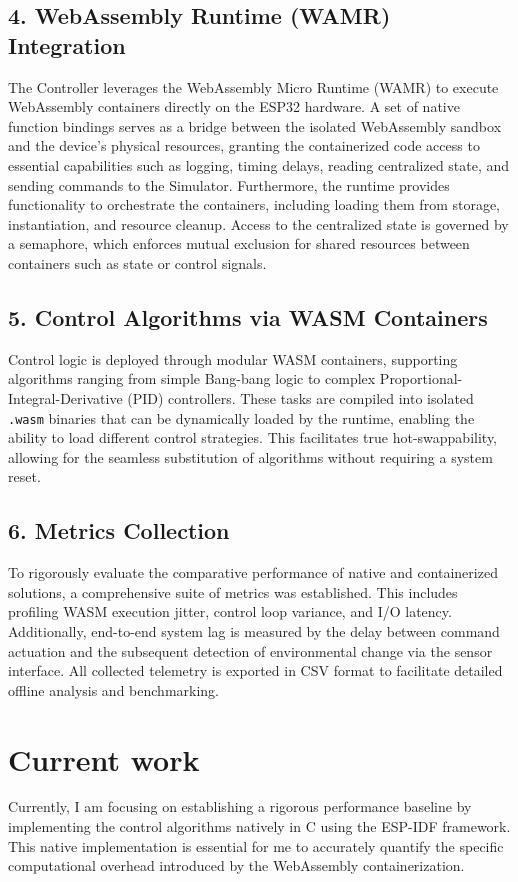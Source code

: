 \documentclass[12pt, a4paper]{report}
\begin{document}
\subsection*{4. WebAssembly Runtime (WAMR) Integration}
The Controller leverages the WebAssembly Micro Runtime (WAMR) to execute WebAssembly containers directly on the ESP32 hardware. A set of native function bindings serves as a bridge between the isolated WebAssembly sandbox and the device's physical resources, granting the containerized code access to essential capabilities such as logging, timing delays, reading centralized state, and sending commands to the Simulator. Furthermore, the runtime provides functionality to orchestrate the containers, including loading them from storage, instantiation, and resource cleanup. Access to the centralized state is governed by a semaphore, which enforces mutual exclusion for shared resources between containers such as state or control signals.

\subsection*{5. Control Algorithms via WASM Containers}
Control logic is deployed through modular WASM containers, supporting algorithms ranging from simple Bang-bang logic to complex Proportional-Integral-Derivative (PID) controllers. These tasks are compiled into isolated \texttt{.wasm} binaries that can be dynamically loaded by the runtime, enabling the ability to load different control strategies. This facilitates true hot-swappability, allowing for the seamless substitution of algorithms without requiring a system reset.

\subsection*{6. Metrics Collection}
To rigorously evaluate the comparative performance of native and containerized solutions, a comprehensive suite of metrics was established. This includes profiling WASM execution jitter, control loop variance, and I/O latency. Additionally, end-to-end system lag is measured by the delay between command actuation and the subsequent detection of environmental change via the sensor interface. All collected telemetry is exported in CSV format to facilitate detailed offline analysis and benchmarking.

\section*{Current work}
Currently, I am focusing on establishing a rigorous performance baseline by implementing the control algorithms natively in C using the ESP-IDF framework. This native implementation is essential for me to accurately quantify the specific computational overhead introduced by the WebAssembly containerization.
\end{document}

